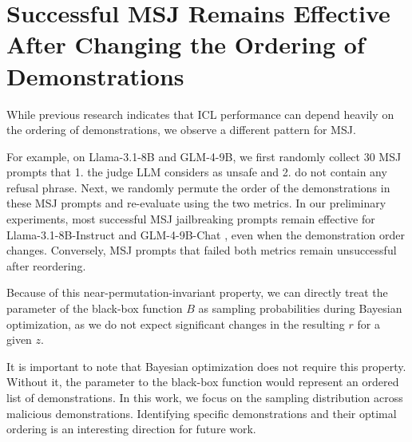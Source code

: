 \section{Successful MSJ Remains Effective After Changing the Ordering of Demonstrations}\label{app:permutation}
While previous research \citep{lu2021fantastically, zhao2021calibrate} indicates that ICL performance can depend heavily on the ordering of demonstrations, we observe a different pattern for MSJ. 

% 

For example, on Llama-3.1-8B and GLM-4-9B, we first randomly collect 30 MSJ prompts that 1. the judge LLM considers as unsafe and 2. do not contain any refusal phrase. Next, we randomly permute the order of the demonstrations in these MSJ prompts and re-evaluate using the two metrics. 
In our preliminary experiments, most successful MSJ jailbreaking prompts remain effective for Llama-3.1-8B-Instruct \citep{dubey2024llama} and GLM-4-9B-Chat \citep{glm2024chatglm}, even when the demonstration order changes. Conversely, MSJ prompts that failed both metrics remain unsuccessful after reordering.

Because of this near-permutation-invariant property, we can directly treat the parameter of the black-box function $B$ as sampling probabilities during Bayesian optimization, as we do not expect significant changes in the resulting $r$ for a given $z$. 

It is important to note that Bayesian optimization does not require this property. Without it, the parameter to the black-box function would represent an ordered list of demonstrations. In this work, we focus on the sampling distribution across malicious demonstrations. Identifying specific demonstrations and their optimal ordering is an interesting direction for future work.



% 


